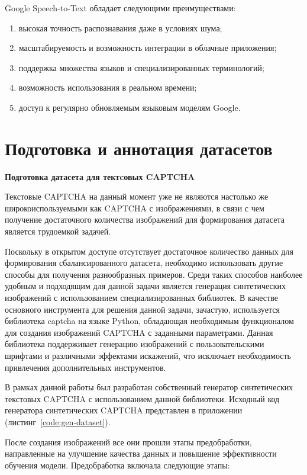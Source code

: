 Google Speech-to-Text обладает следующими преимуществами:

\begin{enumerate}
    \item высокая точность распознавания даже в условиях шума;
    \item масштабируемость и возможность интеграции в облачные приложения;
    \item поддержка множества языков и специализированных терминологий;
    \item возможность использования в реальном времени;
    \item доступ к регулярно обновляемым языковым моделям Google.
\end{enumerate}

\section{Подготовка и аннотация датасетов}

\textbf{Подготовка датасета для тектcовых CAPTCHA}

Текстовые CAPTCHA на данный момент уже не являются настолько же 
широкоиспользуемыми как CAPTCHA с изображениями, в связи с чем получение 
достаточного количества изображений для формирования датасета является трудоемкой 
задачей.

Поскольку в открытом доступе отсутствует достаточное количество данных для 
формирования сбалансированного датасета, необходимо использовать другие способы 
для получения разнообразных примеров. Среди таких способов наиболее удобным и 
подходящим для данной задачи является генерация синтетических изображений с 
использованием специализированных библиотек. В качестве основного инструмента 
для решения данной задачи, зачастую, используется библиотека captcha на языке 
Python, обладающая необходимым функционалом для создания изображений CAPTCHA с 
заданными параметрами. Данная библиотека поддерживает генерацию изображений с 
пользовательскими шрифтами и различными эффектами искажений, что исключает 
необходимость привлечения дополнительных инструментов.

В рамках данной работы был разработан собственный генератор синтетических 
текстовых CAPTCHA с использованием данной библиотеки. Исходный код генератора 
синтетических CAPTCHA представлен в приложении (листинг~\ref{code:gen-dataset}).

После создания изображений все они прошли этапы предобработки, направленные на 
улучшение качества данных и повышение эффективности обучения модели. 
Предобработка включала следующие этапы:

